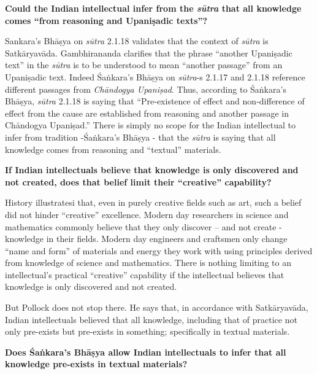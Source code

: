 \textbf{Could the Indian intellectual infer from the {{\sl\bfseries sūtra}\relax} that all knowledge comes ``from reasoning and Upaniṣadic texts''?}

Sankara's Bhāṣya on {\sl sūtra} 2.1.18 validates that the context of {\sl sūtra} is Satkāryavāda.  Gambhirananda clarifies that the phrase ``another Upaniṣadic text'' in the {\sl sūtra} is to be understood to mean ``another passage'' from an Upaniṣadic text. Indeed Śaṅkara's Bhāṣya on {\sl sūtra}-s 2.1.17 and 2.1.18 reference different passages from {\sl Chāndogya Upaniṣad}. Thus, according to Śaṅkara's Bhāṣya, {\sl sūtra} 2.1.18 is saying that ``Pre-existence of effect and non-difference of effect from the cause are established from reasoning and another passage in Chāndogya Upaniṣad.''  There is simply no scope for the Indian intellectual to infer from tradition -Śaṅkara's Bhāṣya - that the {\sl sūtra} is saying that all knowledge comes from reasoning and ``textual'' materials.

\textbf{If Indian intellectuals believe that knowledge is only discovered and not created, does that belief limit their ``creative'' capability?}

History illustratesi that, even in purely creative fields such as art, such a belief did not hinder ``creative'' excellence.  Modern day researchers in science and mathematics commonly believe that they only discover -- and not create - knowledge in their fields.  Modern day engineers and craftsmen only change ``name and form'' of materials and energy they work with using principles derived from knowledge of science and mathematics. There is nothing limiting to an intellectual's practical ``creative'' capability if the intellectual believes that knowledge is only discovered and not created.

But Pollock does not stop there.  He says that, in accordance with Satkāryavāda, Indian intellectuals believed that all knowledge, including that of practice not only pre-exists but pre-exists in something; specifically in textual materials.

\textbf{Does Śaṅkara's Bhāṣya allow Indian intellectuals to infer that all knowledge pre-exists  in textual materials?}

